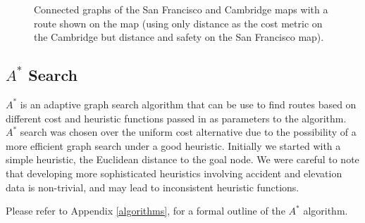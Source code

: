 \documentclass[11pt]{article}
\begin{document}
\begin{figure}%
    \centering
    \qquad
    \caption{Connected graphs of the San Francisco and Cambridge maps with a route shown on the map (using only distance as the cost metric on the Cambridge but distance and safety on the San Francisco map).}
    \label{connected_graphs}%
\end{figure}

\subsection{$A^{*}$ Search}
$A^{*}$ is an adaptive graph search algorithm that can be use to find routes based on different cost and heuristic functions passed in as parameters to the algorithm. $A^{*}$ search was chosen over the uniform cost alternative due to the possibility of a more efficient graph search under a good heuristic. Initially we started with a simple heuristic, the Euclidean distance to the goal node. We were careful to note that developing more sophisticated heuristics involving accident and elevation data is non-trivial, and may lead to inconsistent heuristic functions.\par
Please refer to Appendix \ref{algorithms},  for a formal outline of the $A^{*}$ algorithm.
\end{document}
